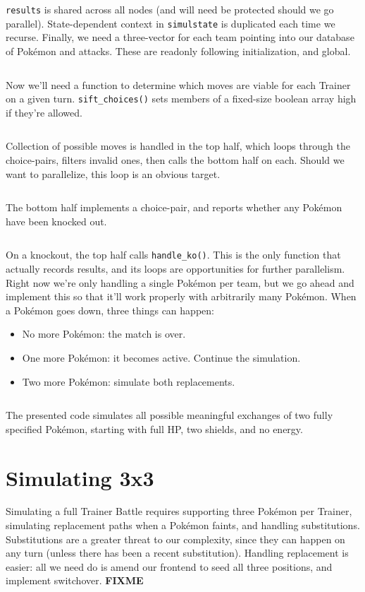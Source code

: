 \texttt{results} is shared across all nodes (and will need be protected should we go parallel).
State-dependent context in \texttt{simulstate} is duplicated each time we recurse.
Finally, we need a three-vector for each team pointing into our database of Pokémon and attacks.
These are readonly following initialization, and global.
\inputminted{cpp}{s/simul.h}
Now we'll need a function to determine which moves are viable for each Trainer on a given turn.
\texttt{sift\_choices()} sets members of a fixed-size boolean array high if they're allowed.
\inputminted{cpp}{s/sift.h}
Collection of possible moves is handled in the top half, which loops through the choice-pairs,
  filters invalid ones, then calls the bottom half on each.
Should we want to parallelize, this loop is an obvious target.
\inputminted{cpp}{s/top.h}
The bottom half implements a choice-pair, and reports whether
  any Pokémon have been knocked out.
\inputminted{cpp}{s/bottom.h}
On a knockout, the top half calls \texttt{handle\_ko()}.
This is the only function that actually records results, and its loops are opportunities for further parallelism.
Right now we're only handling a single Pokémon per team, but we
 go ahead and implement this so that it'll work properly
 with arbitrarily many Pokémon.
When a Pokémon goes down, three things can happen:
\begin{itemize}
  \item No more Pokémon: the match is over.
  \item One more Pokémon: it becomes active. Continue the simulation.
  \item Two more Pokémon: simulate both replacements.
\end{itemize}
\inputminted{cpp}{s/ko.h}
The presented code simulates all possible meaningful exchanges of two fully specified Pokémon, starting
  with full HP, two shields, and no energy.

\section{Simulating 3x3}
\label{sec:simul3x3}
Simulating a full Trainer Battle requires supporting three Pokémon per Trainer,
  simulating replacement paths when a Pokémon faints,
  and handling substitutions.
Substitutions are a greater threat to our complexity, since they can happen
  on any turn (unless there has been a recent substitution).
Handling replacement is easier: all we need do is amend our frontend to
  seed all three positions, and implement switchover.
\textbf{FIXME}
